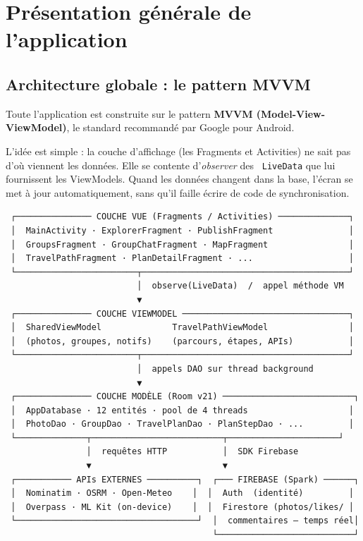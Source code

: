 \documentclass[a4paper,12pt,openany]{report}
\newcommand{\ic}[1]{\texttt{\small\colorbox{lightbg}{\color{navy!90} #1}}}
\begin{document}
\chapter{Présentation générale de l'application}

\section{Architecture globale : le pattern MVVM}

Toute l'application est construite sur le pattern \textbf{MVVM
(Model-View-ViewModel)}, le standard recommandé par Google pour Android.

L'idée est simple : la couche d'affichage (les Fragments et Activities) ne
sait pas d'où viennent les données. Elle se contente d'\emph{observer} des
\ic{LiveData} que lui fournissent les ViewModels. Quand les données changent
dans la base, l'écran se met à jour automatiquement, sans qu'il faille écrire
de code de synchronisation.

\begin{tcolorbox}[mybox,colback=codebg,colframe=bord,
  left=10pt,right=10pt,top=8pt,bottom=8pt]
{\ttfamily\footnotesize\color{navy!80}
\begin{verbatim}
 ┌─────────────── COUCHE VUE (Fragments / Activities) ──────────────┐
 │  MainActivity · ExplorerFragment · PublishFragment               │
 │  GroupsFragment · GroupChatFragment · MapFragment                │
 │  TravelPathFragment · PlanDetailFragment · ...                   │
 └────────────────────────┬─────────────────────────────────────────┘
                          │  observe(LiveData)  /  appel méthode VM
                          ▼
 ┌─────────────── COUCHE VIEWMODEL ─────────────────────────────────┐
 │  SharedViewModel              TravelPathViewModel                │
 │  (photos, groupes, notifs)    (parcours, étapes, APIs)           │
 └────────────────────────┬─────────────────────────────────────────┘
                          │  appels DAO sur thread background
                          ▼
 ┌─────────────── COUCHE MODÈLE (Room v21) ──────────────────────────┐
 │  AppDatabase · 12 entités · pool de 4 threads                    │
 │  PhotoDao · GroupDao · TravelPlanDao · PlanStepDao · ...         │
 └──────────────┬──────────────────────────┬──────────────────────┘
                │  requêtes HTTP           │  SDK Firebase
                ▼                          ▼
 ┌─────────── APIs EXTERNES ──────────┐  ┌─── FIREBASE (Spark) ──────┐
 │  Nominatim · OSRM · Open-Meteo    │  │  Auth  (identité)         │
 │  Overpass · ML Kit (on-device)    │  │  Firestore (photos/likes/ │
 └────────────────────────────────────┘  │  commentaires — temps réel│
                                         └───────────────────────────┘
\end{verbatim}}
\end{tcolorbox}
\end{document}
